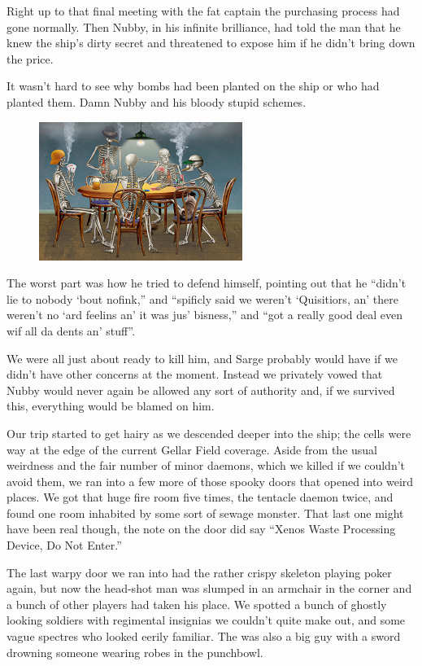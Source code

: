 Right up to that final meeting with the fat captain the purchasing process had gone normally. 
Then Nubby, in his infinite brilliance, had told the man that he knew the ship’s dirty secret and threatened to expose him if he didn’t bring down the price.

It wasn’t hard to see why bombs had been planted on the ship or who had planted them. 
Damn Nubby and his bloody stupid schemes.

\begin{figure}
	\begin{center}
		\includegraphics[width=\figwidth]{pics/7/37.png}
	\end{center}
\end{figure}
The worst part was how he tried to defend himself, pointing out that he “didn’t lie to nobody ‘bout nofink,” and “spificly said we weren’t ‘Quisitiors, an’ there weren’t no ‘ard feelins an’ it was jus’ bisness,” and “got a really good deal even wif all da dents an’ stuff”. 



We were all just about ready to kill him, and Sarge probably would have if we didn’t have other concerns at the moment. 
Instead we privately vowed that Nubby would never again be allowed any sort of authority and, if we survived this, everything would be blamed on him. 


Our trip started to get hairy as we descended deeper into the ship; 
the cells were way at the edge of the current Gellar Field coverage. 
Aside from the usual weirdness and the fair number of minor daemons, which we killed if we couldn’t avoid them, we ran into a few more of those spooky doors that opened into weird places. 
We got that huge fire room five times, the tentacle daemon twice, and found one room inhabited by some sort of sewage monster. 
That last one might have been real though, the note on the door did say “Xenos Waste Processing Device, Do Not Enter.”

The last warpy door we ran into had the rather crispy skeleton playing poker again, but now the head-shot man was slumped in an armchair in the corner and a bunch of other players had taken his place. 
We spotted a bunch of ghostly looking soldiers with regimental insignias we couldn’t quite make out, and some vague spectres who looked eerily familiar. 
The was also a big guy with a sword drowning someone wearing robes in the punchbowl. 


